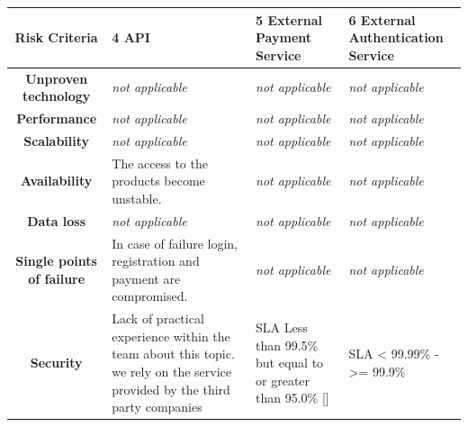 \begin{table}[H]
    \begin{tabularx}{\textwidth}{|c|X|X|X|}
        \toprule
        \textbf{Risk Criteria} & \textbf{4 \gls{API}} & \textbf{5 External Payment Service} & \textbf{6 External Authentication Service} \\
        \midrule
        \textbf{Unproven technology} & \textit{not applicable} & \textit{not applicable}  & \textit{not applicable}  \\
        \hline
        \textbf{Performance} & \textit{not applicable} & \textit{not applicable}  & \textit{not applicable} \\
        \hline
        \textbf{Scalability} & \textit{not applicable} & \textit{not applicable} & \textit{not applicable} \\
        \hline
        \textbf{Availability} & The access to the products become unstable. & \textit{not applicable} & \textit{not applicable} \\
        \hline
        \textbf{Data loss} & \textit{not applicable} & \textit{not applicable} & \textit{not applicable} \\
        \hline
        \textbf{Single points of failure} & In case of failure login, registration and payment are compromised. & \textit{not applicable} & \textit{not applicable} \\
        \hline
        \textbf{Security} & Lack of practical experience within the team about this topic. we rely on the service provided by the third party companies 
        & \gls{SLA} Less than 99.5\% but equal to or greater than 95.0\% [\cite{refmisc:paycSLA}] & \gls{SLA} < 99.99\% - >= 99.9\% \cite{refmisc:auth0sla}	\\
        \bottomrule
    \end{tabularx}
\end{table}
